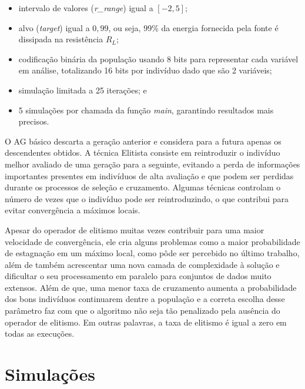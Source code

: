 \documentclass[12pt]{article}
\begin{document}
\begin{itemize}
    \item intervalo de valores (\textit{r\_range}) igual a $\left[-2,5\right]$;
    \item alvo (\textit{target}) igual a $0,99$, ou seja, 99\% da energia fornecida pela fonte é dissipada na resistência $R_L$;
    \item codificação binária da população usando 8 bits para representar cada variável em análise, totalizando 16 bits por indivíduo dado que são 2 variáveis;
    \item simulação limitada a 25 iterações; e
    \item 5 simulações por chamada da função \textit{main}, garantindo resultados mais precisos.
\end{itemize}

\begin{quoting}[rightmargin=0cm,leftmargin=4cm]
\begin{singlespace}
{\footnotesize 
O AG básico descarta a geração anterior e considera para a futura apenas os descendentes obtidos. A técnica Elitista consiste em reintroduzir o indivíduo melhor avaliado de uma geração para a seguinte, evitando a perda de informações importantes presentes em indivíduos de alta avaliação e que podem ser perdidas durante os processos de seleção e cruzamento. Algumas técnicas controlam o número de vezes que o indivíduo pode ser reintroduzindo, o que contribui para evitar convergência a máximos locais. \cite[p. 6]{bento_algoritmos_2008}
}
\end{singlespace}
\end{quoting}

Apesar do operador de elitismo muitas vezes contribuir para uma maior velocidade de convergência, ele cria alguns problemas como a maior probabilidade de estagnação em um máximo local, como pôde ser percebido no último trabalho, além de também acrescentar uma nova camada de complexidade à solução e dificultar o seu processamento em paralelo para conjuntos de dados muito extensos. Além de que, uma menor taxa de cruzamento aumenta a probabilidade dos bons indivíduos continuarem dentre a população e a correta escolha desse parâmetro faz com que o algoritmo não seja tão penalizado pela ausência do operador de elitismo. Em outras palavras, a taxa de elitismo é igual a zero em todas as execuções.

\section{Simulações}



\clearpage

\end{document}
